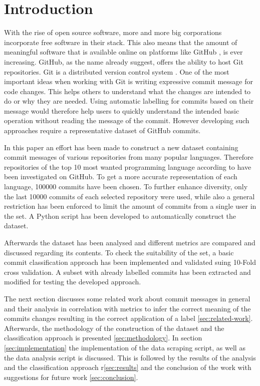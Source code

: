 \section{Introduction}
\label{sec:introduction}

With the rise of open source software, more and more big corporations
incorporate free software in their stack. This also means that the amount of
meaningful software that is available online on platforms like GitHub
\cite{github}, is ever increasing. GitHub, as the name already suggest, offers
the ability to host Git repositories. Git is a distributed version control
system \cite{git}. One of the most important ideas when working with Git
is writing expressive commit message for code changes. This helps others
to understand what the changes are intended to do or why they are needed.
Using automatic labelling for commits based on their message would therefore
help users to quickly understand the intended basic operation without reading
the message of the commit. However developing such approaches require a
representative dataset of GitHub commits.

In this paper an effort has been made to construct a new dataset containing
commit messages of various repositories from many popular languages. Therefore
repositories of the top 10 most wanted programming language according to
\cite{so-survey} have been investigated on GitHub. To get a more accurate
representation of each language, 100000 commits have been chosen. To further
enhance diversity, only the last 10000 commits of each selected repository
were used, while also a general restriction has been enforced to limit the
amount of commits from a single user in the set. A Python script has been
developed to automatically construct the dataset.

Afterwards the dataset has been analysed and different metrics are
compared and discussed regarding its contents. To check the
suitability of the set, a basic commit classification approach has been
implemented and validated suing 10-Fold cross validation. A subset with
already labelled commits has been extracted and modified for testing the
developed approach.

The next section discusses some related work about commit messages in
general and their analysis in correlation with metrics to infer the
correct meaning of the commits changes resulting in the correct application
of a label \ref{sec:related-work}. Afterwards, the methodology of the
construction of the dataset and the classification approach is presented
\ref{sec:methodology}. In section \ref{sec:implementation} the
implementation of the data scraping script, as well as the data analysis
script is discussed. This is followed by the results of the analysis and
the classification approach r\ref{sec:results} and the conclusion of the
work with suggestions for future work \ref{sec:conclusion}.
